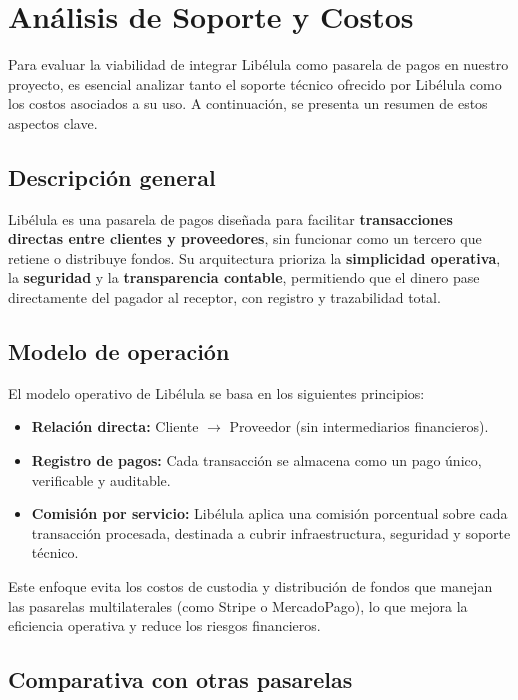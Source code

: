 \section{Análisis de Soporte y Costos}
    \noindent
    Para evaluar la viabilidad de integrar Libélula como pasarela de pagos en nuestro proyecto, es esencial analizar 
    tanto el soporte técnico ofrecido por Libélula como los costos asociados a su uso. A continuación, se presenta un 
    resumen de estos aspectos clave.\par

  \subsection{Descripción general}
      \noindent
      Libélula es una pasarela de pagos diseñada para facilitar \textbf{transacciones directas entre clientes y proveedores}, sin 
      funcionar como un tercero que retiene o distribuye fondos. Su arquitectura prioriza la \textbf{simplicidad operativa}, 
      la \textbf{seguridad} y la \textbf{transparencia contable}, permitiendo que el dinero pase directamente del pagador al 
      receptor, con registro y trazabilidad total.\par
      
  \subsection{Modelo de operación}
      \noindent
      El modelo operativo de Libélula se basa en los siguientes principios:
      \begin{itemize}
        \item \textbf{Relación directa:} Cliente $\rightarrow$ Proveedor (sin intermediarios financieros).
        \item \textbf{Registro de pagos:} Cada transacción se almacena como un pago único, verificable y auditable.
        \item \textbf{Comisión por servicio:} Libélula aplica una comisión porcentual sobre cada transacción procesada, destinada a cubrir infraestructura, seguridad y soporte técnico.
      \end{itemize}    
      Este enfoque evita los costos de custodia y distribución de fondos que manejan las pasarelas multilaterales (como Stripe 
    o MercadoPago), lo que mejora la eficiencia operativa y reduce los riesgos financieros.\par

  \subsection{Comparativa con otras pasarelas}
      
